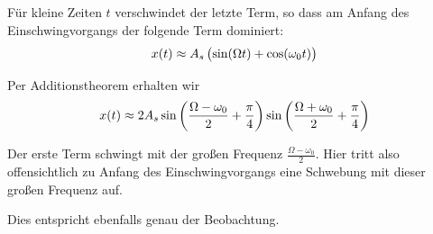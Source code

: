 \documentclass[a4paper,german,12pt,smallheadings]{scrartcl}
\begin{document}
Für kleine Zeiten $t$ verschwindet der letzte Term, so dass am Anfang des
Einschwingvorgangs der folgende Term dominiert:
\begin{equation}
  x(t) \approx A_s \del{\sin(\Omega t) + \cos(\omega_0 t)}
\end{equation}

Per Additionstheorem erhalten wir
\begin{equation}
  x(t) \approx 2 A_s \sin\del{\frac{\Omega - \omega_0}{2} + \frac{\pi}{4}}
  \sin\del{\frac{\Omega + \omega_0}{2} + \frac{\pi}{4}}
\end{equation}

Der erste Term schwingt mit der großen Frequenz $\frac{\Omega - \omega_0}{2}$.
Hier tritt also offensichtlich zu Anfang des Einschwingvorgangs eine Schwebung
mit dieser großen Frequenz auf.

Dies entspricht ebenfalls genau der Beobachtung.



\newpage
\label{plot:amp}
\begin{landscape}
  
\end{landscape}
\end{document}
